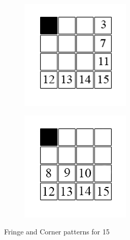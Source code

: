 \documentclass[final]{cmpreport}
\begin{document}
\begin{figure}[ht]
	\centering
	\captionsetup{justification=centering}
	
	\begin{subfigure}{.3\textwidth}
		\centering
		\includegraphics[width=.9\textwidth]{fringe}
	\end{subfigure}%
	\begin{subfigure}{.3\textwidth}
		\centering
		\includegraphics[width=.9\textwidth]{corner}
	\end{subfigure}
	\caption{Fringe and Corner patterns for 15 }
	\label{fig:fringe}
\end{figure}
\end{document}
